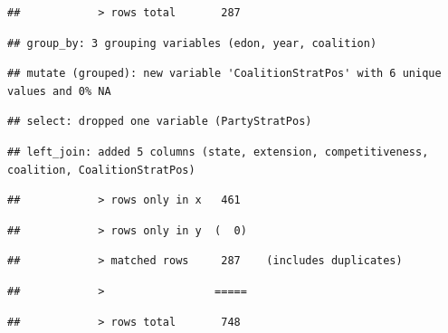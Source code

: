 \documentclass[]{article}
\newenvironment{Shaded}{\begin{snugshade}}{\end{snugshade}}
\newcommand{\DataTypeTok}[1]{\textcolor[rgb]{0.13,0.29,0.53}{#1}}
\newcommand{\KeywordTok}[1]{\textcolor[rgb]{0.13,0.29,0.53}{\textbf{#1}}}
\newcommand{\NormalTok}[1]{#1}
\newcommand{\OperatorTok}[1]{\textcolor[rgb]{0.81,0.36,0.00}{\textbf{#1}}}
\newcommand{\StringTok}[1]{\textcolor[rgb]{0.31,0.60,0.02}{#1}}
\begin{document}
\begin{verbatim}
##            > rows total       287
\end{verbatim}

\begin{verbatim}
## group_by: 3 grouping variables (edon, year, coalition)
\end{verbatim}

\begin{verbatim}
## mutate (grouped): new variable 'CoalitionStratPos' with 6 unique values and 0% NA
\end{verbatim}

\begin{verbatim}
## select: dropped one variable (PartyStratPos)
\end{verbatim}

\begin{Shaded}
\end{Shaded}

\begin{verbatim}
## left_join: added 5 columns (state, extension, competitiveness, coalition, CoalitionStratPos)
\end{verbatim}

\begin{verbatim}
##            > rows only in x   461
\end{verbatim}

\begin{verbatim}
##            > rows only in y  (  0)
\end{verbatim}

\begin{verbatim}
##            > matched rows     287    (includes duplicates)
\end{verbatim}

\begin{verbatim}
##            >                 =====
\end{verbatim}

\begin{verbatim}
##            > rows total       748
\end{verbatim}

\begin{Shaded}
\end{Shaded}
\end{document}
